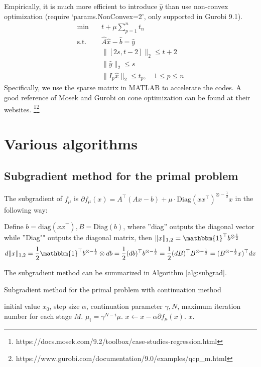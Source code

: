 \documentclass{article}
\numberwithin{equation}{section}
\numberwithin{figure}{section}
\begin{document}
Empirically, it is much more efficient to introduce $\hat{y}$ than use non-convex optimization (require `params.NonConvex=2', only supported in Gurobi 9.1). 
\begin{equation}
\begin{split}
        \min&\quad  t+\mu \sum_{p=1}^n t_n\\
        \mathrm{s.t.}&\quad \hat{A}\hat{x}-\hat{b} = \hat{y}\\
        &\quad \|[2s,t-2] \|_2 \leq t+2\\ 
        &\quad \|\hat{y}\|_2\leq s\\
        &\quad \|I_p \hat{x}\|_2\leq t_p, \quad 1\leq p \leq n
\end{split}\label{eq:reformation1}
\end{equation}
Specifically, we use the sparse matrix in MATLAB to accelerate the codes. A good reference of Mosek and Gurobi on cone optimization can be found at their websites. \footnote{https://docs.mosek.com/9.2/toolbox/case-studies-regression.html}\footnote{https://www.gurobi.com/documentation/9.0/examples/qcp\_m.html}

\section{Various algorithms}

\subsection{Subgradient method for the primal problem}
The subgradient of $f_\mu$ is $\partial f_\mu(x) = A^\top(Ax-b)+\mu\cdot  \mathrm{Diag}(xx^\top)^{\otimes -\frac{1}{2}}x$ in the following way:

Define $b = \mathrm{diag}(xx^\top),B=\mathrm{Diag}(b)$, where ''diag'' outputs the diagonal vector while ''Diag"" outputs the diagonal matrix, then $\|x\|_{1,2} =\mathbbm{1}^\top b^{\otimes \frac{1}{2}}$
\begin{equation}
d\|x\|_{1,2} = \frac{1}{2}\mathbbm{1}^\top b^{\otimes -\frac{1}{2}} \otimes db = \frac{1}{2}(db)^\top b^{\otimes -\frac{1}{2}} =\frac{1}{2} (dB)^\top B^{\otimes -\frac{1}{2}} = (B^{\otimes -\frac{1}{2}}x )^\top dx
\end{equation}

The subgradient method can be summarized in Algorithm \ref{alg:subgrad}.

\begin{algorithm}[!htbp]\caption{Subgradient method for the primal problem with continuation method}\label{alg:subgrad}
\begin{algorithmic}[1]
 initial value $x_0$, step size $\alpha$, continuation parameter $\gamma,N$, maximum iteration number for each stage $M$.
\STATE $\mu_i = \gamma^{N-i}\mu$.
\STATE $x\leftarrow x - \alpha \partial f_\mu(x)$.
\ENDFOR
\ENDFOR
{} $x$.
\end{algorithmic}
\end{algorithm}
\end{document}
